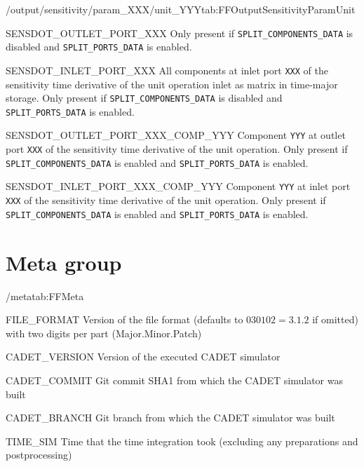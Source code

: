 \begin{groupscope}{/output/sensitivity/param\_XXX/unit\_YYY}{tab:FFOutputSensitivityParamUnit}
\begin{dataset}[type=double,unit={\si{\mol\per\cubic\metre\of{IV}\per\second\per\ParamUnit}}]{SENSDOT\_OUTLET\_PORT\_XXX}
    Only present if \texttt{SPLIT\_COMPONENTS\_DATA} is disabled and \texttt{SPLIT\_PORTS\_DATA} is enabled.
  \end{dataset}
  \begin{dataset}[type=double,unit={\si{\mol\per\cubic\metre\of{IV}\per\second\per\ParamUnit}}]{SENSDOT\_INLET\_PORT\_XXX}
    All components at inlet port \texttt{XXX} of the sensitivity time derivative of the unit operation inlet as matrix in time-major storage.
    Only present if \texttt{SPLIT\_COMPONENTS\_DATA} is disabled and \texttt{SPLIT\_PORTS\_DATA} is enabled.
  \end{dataset}
  \begin{dataset}[type=double,unit={\si{\mol\per\cubic\metre\of{IV}\per\second\per\ParamUnit}}]{SENSDOT\_OUTLET\_PORT\_XXX\_COMP\_YYY}
    Component \texttt{YYY} at outlet port \texttt{XXX} of the sensitivity time derivative of the unit operation.
    Only present if \texttt{SPLIT\_COMPONENTS\_DATA} is enabled and \texttt{SPLIT\_PORTS\_DATA} is enabled.
  \end{dataset}
  \begin{dataset}[type=double,unit={\si{\mol\per\cubic\metre\of{IV}\per\second\per\ParamUnit}}]{SENSDOT\_INLET\_PORT\_XXX\_COMP\_YYY}
    Component \texttt{YYY} at inlet port \texttt{XXX} of the sensitivity time derivative of the unit operation.
    Only present if \texttt{SPLIT\_COMPONENTS\_DATA} is enabled and \texttt{SPLIT\_PORTS\_DATA} is enabled.
  \end{dataset}
\end{groupscope}

\section{Meta group}

\begin{groupscope}{/meta}{tab:FFMeta}
  \begin{dataset}[type=int,inout={In}]{FILE\_FORMAT}
    Version of the file format (defaults to $030102 = 3.1.2$ if omitted) with two digits per part (Major.Minor.Patch)
  \end{dataset}
  \begin{dataset}[type=string,inout={Out}]{CADET\_VERSION}
    Version of the executed CADET simulator
  \end{dataset}
  \begin{dataset}[type=string,inout={Out}]{CADET\_COMMIT}
    Git commit SHA1 from which the CADET simulator was built
  \end{dataset}
  \begin{dataset}[type=string,inout={Out}]{CADET\_BRANCH}
    Git branch from which the CADET simulator was built
  \end{dataset}
  \begin{dataset}[type=double,unit={\si{\second}},inout={Out}]{TIME\_SIM}
    Time that the time integration took (excluding any preparations and postprocessing)
  \end{dataset}
\end{groupscope}
